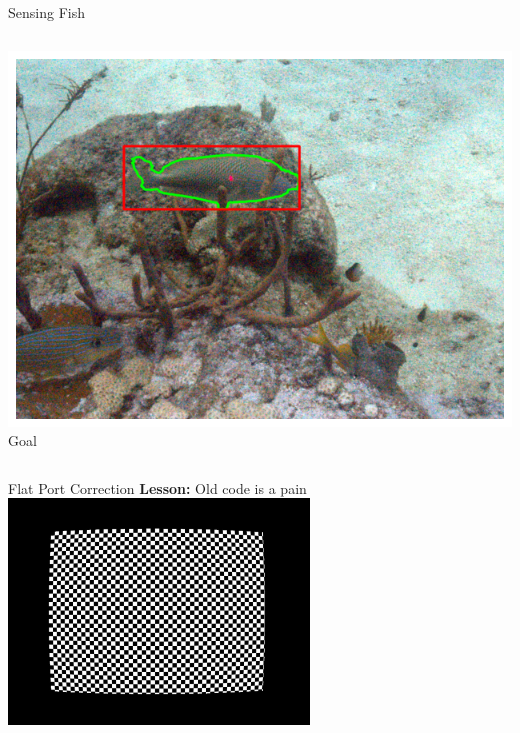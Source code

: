 \begin{frame}{Sensing Fish}
\begin{columns}
\begin{column}{0.33\textwidth}
            \includegraphics[width=\linewidth,keepaspectratio]{images/ideal.png}
            {\small Goal}
        \end{column}
    \end{columns}
\end{frame}

\begin{frame}{Flat Port Correction}
    \centering
    \textbf{Lesson:} Old code is a pain
    \includegraphics[width=0.6\textwidth,keepaspectratio]{images/remapped.jpg}
\end{frame}

